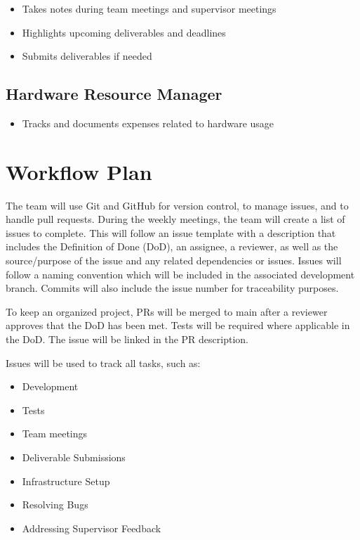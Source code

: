 \documentclass{article}
\begin{document}
\begin{itemize}
  \item Takes notes during team meetings and supervisor meetings
  \item Highlights upcoming deliverables and deadlines
  \item Submits deliverables if needed
\end{itemize}

\subsection{Hardware Resource Manager }

\begin{itemize}
  \item Tracks and documents expenses related to hardware usage
\end{itemize}


\section{Workflow Plan}

  \begin{comment}
	\item How will you be using git, including branches, pull request, etc.?
	\item How will you be managing issues, including template issues, issue
	classification, etc.?
  \item Use of CI/CD
  \item 
\end{comment}
  
The team will use Git and GitHub for version control, to manage issues, and to handle pull requests. During the weekly meetings, the team will create a list of issues to complete. This will follow an issue template with a description that includes the Definition of Done (DoD), an assignee, a reviewer, as well as the source/purpose of the issue and any related dependencies or issues. Issues will follow a naming convention which will be included in the associated development branch. Commits will also include the issue number for traceability purposes.

\noindent To keep an organized project, PRs will be merged to main after a reviewer approves that the DoD has been met. Tests will be required where applicable in the DoD. The issue will be linked in the PR description.

Issues will be used to track all tasks, such as:
\begin{itemize}
    \item Development
    \item Tests
    \item Team meetings
    \item Deliverable Submissions
    \item Infrastructure Setup
    \item Resolving Bugs
    \item Addressing Supervisor Feedback
\end{itemize}
\end{document}
